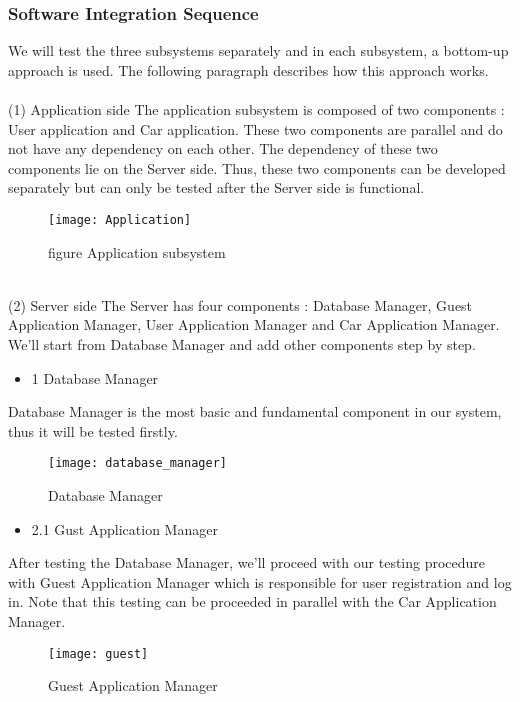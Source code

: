 \documentclass{article}
\begin{document}
  \subsubsection{Software Integration Sequence}
  We will test the three subsystems separately and in each subsystem, a bottom-up approach is used. The following paragraph describes how this approach works.\\
  \\
  (1) Application side
  The application subsystem is composed of two components : User application and Car application. These two components are parallel and do not have any dependency on each other. The dependency of these two components lie on the Server side. Thus, these two components can be developed separately but can only be tested after the Server side is functional. 
  \begin{figure}[h]
  	\centering
  	\texttt{[image: Application]}
  	\caption{figure Application subsystem}
  \end{figure}
\newline
 \\(2) Server side
 The Server has four components : Database Manager, Guest Application Manager, User Application Manager and Car Application Manager. We'll start from Database Manager and add other components step by step. 
 \begin{itemize}
 	\item 1 Database Manager
 \end{itemize}
Database Manager is the most basic and fundamental component in our system, thus it will be tested firstly.
 \begin{figure}[h]
 	\centering
 	\texttt{[image: database\_manager]}
 	\caption{Database Manager}
 \end{figure}

 \begin{itemize}
 	\item 2.1 Gust Application Manager
 \end{itemize}
After testing the Database Manager, we'll proceed with our testing procedure with Guest Application Manager which is responsible for user registration and log in.
Note that this testing can be proceeded in parallel with the Car Application Manager.
 \begin{figure}[h]
	\centering
	\texttt{[image: guest]}
	\caption{Guest Application Manager}
\end{figure}
 
\end{document}
